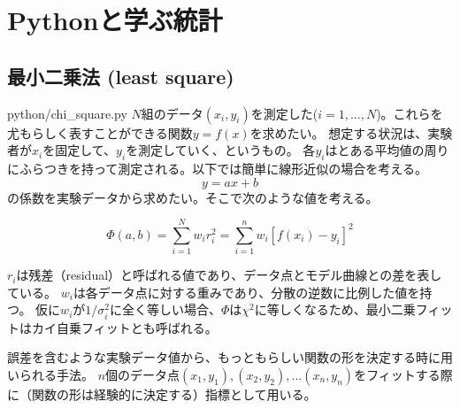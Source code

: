 
\chapter{Pythonと学ぶ統計}
\section{最小二乗法 (least square)}
python/chi\_square.py
$N$組のデータ$(x_i,y_i)$を測定した($i=1,...,N$)。これらを尤もらしく表すことができる関数$y=f(x)$を求めたい。
想定する状況は、実験者が$x_i$を固定して、$y_i$を測定していく、というもの。
各$y_i$はとある平均値の周りにふらつきを持って測定される。以下では簡単に線形近似の場合を考える。
\begin{equation}
  y = ax + b
\end{equation}
の係数を実験データから求めたい。そこで次のような値を考える。

\begin{equation}
  \Phi(a,b) = \sum_{i=1}^{N} w_i r_i^{2} = \sum_{i=1}^{n} w_i[f(x_i)-y_i]^2
\end{equation}

$r_i$は残差（residual）と呼ばれる値であり、データ点とモデル曲線との差を表している。
$w_i$は各データ点に対する重みであり、分散の逆数に比例した値を持つ。
仮に$w_i$が$1/\sigma_i^2$に全く等しい場合、$\Phi$は$\chi^2$に等しくなるため、最小二乗フィットはカイ自乗フィットとも呼ばれる。


誤差を含むような実験データ値から、もっともらしい関数の形を決定する時に用いられる手法。
$n$個のデータ点$(x_1,y_1), (x_2,y_2), ... (x_n, y_n)$をフィットする際に（関数の形は経験的に決定する）指標として用いる。
